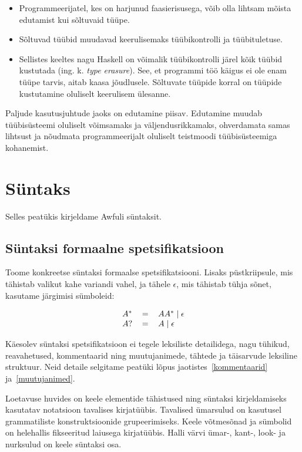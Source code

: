 \documentclass[12pt]{article}
\newcommand\peatykk[1]{
  \clearpage
  \section{#1}}
\begin{document}
      \begin{itemize}
        \item
          Programmeerijatel, kes on harjunud faasierisusega, võib olla lihtsam mõista edutamist kui sõltuvaid tüüpe.
        \item
          Sõltuvad tüübid muudavad keerulisemaks tüübikontrolli ja tüübituletuse.
        \item
          Sellistes keeltes nagu Haskell on võimalik tüübikontrolli järel kõik tüübid kustutada (ing. k. \textit{type erasure}). See, et programmi töö käigus ei ole enam tüüpe tarvis, aitab kaasa jõudlusele. Sõltuvate tüüpide korral on tüüpide kustutamine oluliselt keerulisem ülesanne.
      \end{itemize}

      Paljude kasutusjuhtude jaoks on edutamine piisav. Edutamine muudab tüübisüsteemi oluliselt võimsamaks ja väljendusrikkamaks, ohverdamata samas lihtsust ja nõudmata programmeerijalt oluliselt teistmoodi tüübisüsteemiga kohanemist.
  \peatykk{Süntaks}\label{syntaks}
    Selles peatükis kirjeldame Awfuli süntaksit.
    \subsection{Süntaksi formaalne spetsifikatsioon}
      Toome konkreetse süntaksi formaalse spetsifikatsiooni. Lisaks püstkriipsule, mis tähistab valikut kahe variandi vahel, ja tähele $\epsilon$, mis tähistab tühja sõnet, kasutame järgimisi sümboleid:

      \begin{equation*}
        \begin{tabular}{lll}
          $A^*$ & $=$ & $AA^*\mid\epsilon$ \\
          $A?$  & $=$ & $A\mid\epsilon$
        \end{tabular}
      \end{equation*}

      Käesolev süntaksi spetsifikatsioon ei tegele leksiliste detailidega, nagu tühikud, reavahetused, kommentaarid ning muutujanimede, tähtede ja täisarvude leksiline struktuur. Neid detaile selgitame peatüki lõpus jaotistes~\ref{kommentaarid} ja~\ref{muutujanimed}.

      Loetavuse huvides on keele elementide tähistused ning süntaksi kirjeldamiseks kasutatav notatsioon tavalises kirjatüübis. Tavalised ümarsulud on kasutusel grammatiliste konstruktsioonide grupeerimiseks. Keele võtmesõnad ja sümbolid on helehallis fikseeritud laiusega kirjatüübis. Halli värvi ümar-, kant-, look- ja nurksulud on keele süntaksi osa.
\end{document}
